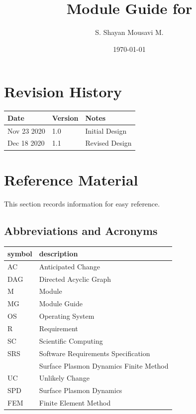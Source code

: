 \documentclass[12pt, titlepage]{article}
\begin{document}
	
	\title{Module Guide for \progname{}} \author{S. Shayan Mousavi M.} \date{\today}
	
	\maketitle
	
	
	\section{Revision History}
	
	\begin{tabularx}{\textwidth}{p{3cm}p{2cm}X} \toprule {\bf Date} & {\bf Version}
		& {\bf Notes}\\ \midrule Nov 23 2020 & 1.0 & Initial Design\\
		Dec 18 2020 & 1.1 & Revised Design\\
		\bottomrule \end{tabularx}
	
	\newpage
	
	\section{Reference Material}
	
	This section records information for easy reference.
	
	\subsection{Abbreviations and Acronyms}
	
	\renewcommand{\arraystretch}{1.2} \begin{tabular}{l l} \toprule \textbf{symbol}
		& \textbf{description}\\ \midrule AC & Anticipated Change\\ DAG & Directed
		Acyclic Graph \\ M & Module \\ MG & Module Guide \\ OS & Operating System \\ R &
		Requirement\\ SC & Scientific Computing \\ SRS & Software Requirements
		Specification\\ \progname{} & Surface Plasmon Dynamics Finite Method\\ UC & Unlikely Change
		\\ SPD & Surface Plasmon Dynamics\\ FEM & Finite Element Method\\ \bottomrule \end{tabular}\\
	
\end{document}
